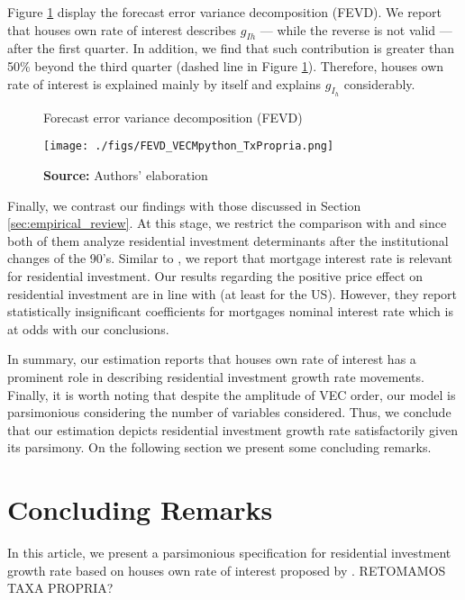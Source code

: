 \documentclass[12pt, a4paper]{article}
\begin{document}
Figure \ref{fevd} display the forecast error variance decomposition (FEVD).
We report that houses own rate of interest describes \(g_{Ih}\) --- while the reverse is not valid --- after the first quarter.
In addition, we find that such contribution is greater than 50\% beyond the third quarter (dashed line in Figure \ref{fevd}).
Therefore, houses own rate of interest is explained mainly by itself and explains \(g_{I_h}\) considerably.

\begin{figure}[H]
	\centering
	\caption{Forecast error variance decomposition (FEVD)}
	\label{fevd}
	\texttt{[image: ./figs/FEVD\_VECMpython\_TxPropria.png]}
	\caption*{\textbf{Source:} Authors' elaboration}
\end{figure}


Finally,  we contrast our findings with those discussed in Section \ref{sec:empirical_review}.
At this stage, we restrict the comparison with  \textcite{gauger_residential_2003} and \textcite{arestis_residential_2015} since both of them analyze residential investment determinants after the institutional changes of the 90's.
Similar to \textcite{gauger_residential_2003}, we report that mortgage interest rate is relevant for residential investment.
Our results regarding the positive price effect on residential investment are in line with \textcite{arestis_residential_2015} (at least for the US).
However, they report statistically insignificant coefficients for mortgages nominal interest rate which is at odds with our conclusions.

In summary, our estimation reports that houses own rate of interest has a prominent role in describing residential investment growth rate movements.
Finally, it is worth noting that despite the amplitude of VEC order, our model is parsimonious considering the number of variables considered.
Thus, we conclude that our estimation depicts residential investment growth rate satisfactorily given its parsimony.
On the following section we present some concluding remarks.

\section{Concluding Remarks}
\label{sec:org8f131f9}
\label{sec:Conclusion}
In this article, we present a parsimonious specification for residential investment growth rate based on houses own rate of interest proposed by \textcite{teixeira_crescimento_2015}.
RETOMAMOS TAXA PROPRIA?
\end{document}
